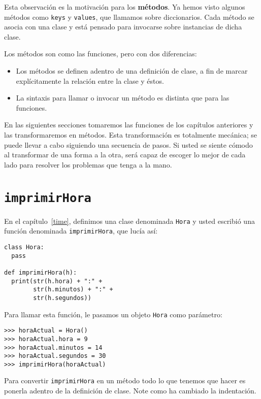 Esta observación es la motivación para los \textbf{métodos}. Ya hemos
visto algunos métodos como \texttt{keys} y \texttt{values}, que llamamos
sobre diccionarios. Cada método se asocia con una clase y está pensado
para invocarse sobre instancias de dicha clase.

   

Los métodos son como las funciones, pero con dos diferencias:
\begin{itemize}
\item Los métodos se definen adentro de una definición de clase, a fin de
marcar explícitamente la relación entre la clase y éstos.
\item La sintaxis para llamar o invocar un método es distinta que para las
funciones.
\end{itemize}
En las siguientes secciones tomaremos las funciones de los capítulos
anteriores y las transformaremos en métodos. Esta transformación es
totalmente mecánica; se puede llevar a cabo siguiendo una secuencia
de pasos. Si usted se siente cómodo al transformar de una forma a
la otra, será capaz de escoger lo mejor de cada lado para resolver
los problemas que tenga a la mano.

\section{\texttt{imprimirHora}}

\label{printTime} 

En el capítulo~\ref{time}, definimos una clase denominada \texttt{Hora}
y usted escribió una función denominada \texttt{imprimirHora}, que
lucía así:
\begin{verbatim}
class Hora:
  pass

def imprimirHora(h):
  print(str(h.hora) + ":" + 
        str(h.minutos) + ":" + 
        str(h.segundos))
\end{verbatim}

Para llamar esta función, le pasamos un objeto \texttt{Hora} como
parámetro:
\begin{verbatim}
>>> horaActual = Hora()
>>> horaActual.hora = 9
>>> horaActual.minutos = 14
>>> horaActual.segundos = 30
>>> imprimirHora(horaActual)
\end{verbatim}

Para convertir \texttt{imprimirHora} en un método todo lo que tenemos
que hacer es ponerla adentro de la definición de clase. Note como
ha cambiado la indentación.

